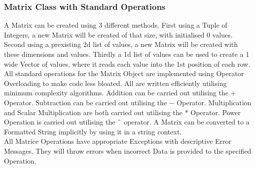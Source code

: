 \begin{flushleft}
        \subsubsection{Matrix Class with Standard Operations}
            \vspace{0.2cm}
            A Matrix can be created using 3 different methods. First using a Tuple of Integers, a new Matrix will be created of that size, with initialised
            0 values. Second using a prexisting 2d list of values, a new Matrix will be created with these dimensions and values. Thirdly a 1d list of
            values can be used to create a 1 wide Vector of values, where it reads each value into the 1st position of each row. \\
            \vspace{0.2cm}
            All standard operations for the Matrix Object are implemented using Operator Overloading to make code less bloated. All are written 
            efficiently utilising minimum complexity algorithms. Addition can be carried out utilising the $+$ Operator. Subtraction can be carried out
            utilising the $-$ Operator. Multiplication and Scalar Multiplication are both carried out utilising the $*$ Operator. Power Operation is
            carried out utilising the $\string^$ operator. A Matrix can be converted to a Formatted String implicitly by using it in a string context. \\
            \vspace{0.2cm}
            All Matrice Operations have appropriate Exceptions with descriptive Error Messages. They will throw errors when incorrect Data is provided to
            the specified Operation. \\

            \vspace{0.5cm}   

\end{flushleft}
